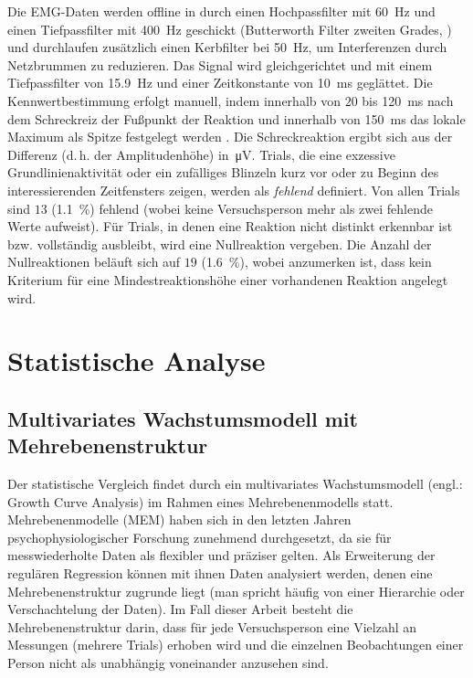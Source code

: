 			Die EMG-Daten werden offline in \citeauthor{MATLAB} durch einen Hochpassfilter mit \SI{60}{\hertz} und einen Tiefpassfilter mit \SI{400}{\hertz} geschickt (Butterworth Filter zweiten Grades, ) %
			und durchlaufen zusätzlich einen Kerbfilter bei \SI{50}{\hertz}, um Interferenzen durch Netzbrummen zu reduzieren. %
			Das Signal wird gleichgerichtet und mit einem Tiefpassfilter von \SI{15.9}{\hertz} und einer Zeitkonstante von \SI{10}{\milli\second} geglättet. %
			Die Kennwertbestimmung erfolgt manuell, indem innerhalb von $20$ bis \SI{120}{\milli\second} nach dem Schreckreiz der Fußpunkt der Reaktion und innerhalb von \SI{150}{\milli\second} das lokale Maximum als Spitze festgelegt werden \parencite{BLUMENTHAL2005}. Die Schreckreaktion ergibt sich aus der Differenz (d.\,h. der Amplitudenhöhe) in~\si{\micro\volt}.
			Trials, die eine exzessive Grundlinienaktivität oder ein zufälliges Blinzeln kurz vor oder zu Beginn des interessierenden Zeitfensters zeigen, werden als \textit{fehlend}  definiert. Von allen Trials sind $13$ (\SI{1.1}{\percent}) fehlend (wobei keine Versuchsperson mehr als zwei fehlende Werte aufweist). 
			Für Trials, in denen eine Reaktion nicht distinkt erkennbar ist bzw. vollständig ausbleibt, wird eine Nullreaktion vergeben. Die Anzahl der Nullreaktionen beläuft sich auf $19$ (\SI{1.6}{\percent}), wobei anzumerken ist, dass kein Kriterium für eine Mindestreaktionshöhe einer vorhandenen Reaktion angelegt wird.
	
	
\section{Statistische Analyse}\label{statistik}
	
	\subsection{Multivariates Wachstumsmodell mit Mehrebenenstruktur}
		Der statistische Vergleich findet durch ein multivariates Wachstumsmodell (engl.: Growth Curve Analysis) im Rahmen eines Mehrebenenmodells statt. 
		Mehrebenenmodelle (MEM) haben sich in den letzten Jahren psychophysiologischer Forschung zunehmend durchgesetzt, da sie für messwiederholte Daten als flexibler und präziser gelten. Als Erweiterung der regulären Regression können mit ihnen Daten analysiert werden, denen eine Mehrebenenstruktur zugrunde liegt (man spricht häufig von einer Hierarchie oder Verschachtelung der Daten).
		Im Fall dieser Arbeit besteht die Mehrebenenstruktur darin, dass für jede Versuchsperson eine Vielzahl an Messungen (mehrere Trials) erhoben wird und die einzelnen Beobachtungen einer Person nicht als unabhängig voneinander anzusehen sind.
		 
